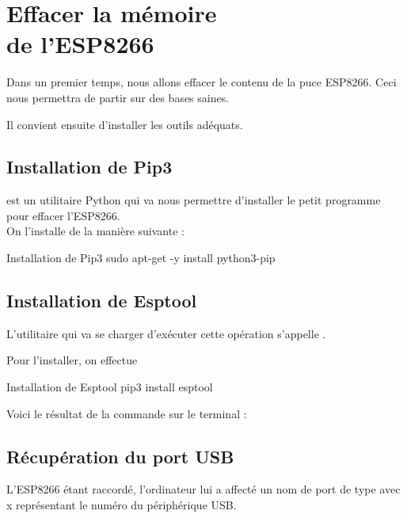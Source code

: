 
\chapter{Effacer la mémoire \\de l'ESP8266}

Dans un premier temps, nous allons effacer le contenu de la puce ESP8266. Ceci nous permettra de partir sur des bases saines. \\


Il convient ensuite d'installer les outils adéquats.

\section{Installation de Pip3}

 est un utilitaire Python qui va nous permettre d'installer le petit programme pour effacer l'ESP8266. \\
On l'installe de la manière suivante : 

\begin{Bash}{Installation de Pip3}
sudo apt-get -y install python3-pip
\end{Bash}


\section{Installation de Esptool}

L'utilitaire qui va se charger d'exécuter cette opération s'appelle .

Pour l'installer, on effectue

\begin{Bash}{Installation de Esptool}
pip3 install esptool
\end{Bash}

Voici le résultat de la commande sur le terminal : 




\section{Récupération du port USB}

L'ESP8266 étant raccordé, l'ordinateur lui a affecté un nom de port de type  avec x représentant le numéro du périphérique USB. \\

